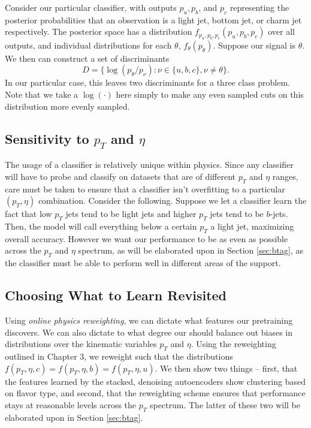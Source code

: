 Consider our particular classifier, with outputs $p_u, p_b$, and $p_c$ representing the posterior probabilities that an observation is a light jet, bottom jet, or charm jet respectively. The posterior space has a distribution $f_{p_u,p_b,p_c}(p_u, p_b, p_c)$ over all outputs, and individual distributions for each $\theta$, $f_\theta(p_\theta)$. Suppose our signal is $\theta$. We then can construct a set of discriminants
\begin{equation}
D = \{ \log(p_\theta / p_\nu) : \nu \in \{u,b,c\}, \nu \neq \theta \}.
\end{equation} 
In our particular case, this leaves two discriminants for a three class problem. Note that we take a $\log(\cdot)$ here simply to make any even sampled cuts on this distribution more evenly sampled. 

\subsection{Sensitivity to $p_T$ and $\eta$}

The usage of a classifier is relatively unique within physics. Since any classifier will have to probe and classify on datasets that are of different $p_T$ and $\eta$ ranges, care must be taken to ensure that a classifier isn't overfitting to a particular $(p_T,\eta)$ combination. Consider the following. Suppose we let a classifier learn the fact that low $p_T$ jets tend to be light jets and higher $p_T$ jets tend to be $b$-jets. Then, the model will call everything below a certain $p_T$ a light jet, maximizing overall accuracy. However we want our performance to be as even as possible across the $p_T$ and $\eta$ spectrum, as will be elaborated upon in Section \ref{sec:btag}, as the classifier must be able to perform well in different areas of the support.

\subsection{Choosing What to Learn Revisited}

Using \emph{online physics reweighting}, we can dictate what features our pretraining discovers. We can also dictate to what degree our \nn{} should balance out biases in distributions over the kinematic variables $p_T$ and $\eta$. Using the reweighting outlined in Chapter 3, we reweight such that the distributions $f(p_T, \eta, c)=f(p_T, \eta, b)=f(p_T, \eta, u)$. We then show two things -- first, that the features learned by the stacked, denoising autoencoders show clustering based on flavor type, and second, that the reweighting scheme ensures that performance stays at reasonable levels across the $p_T$ spectrum. The latter of these two will be elaborated upon in Section \ref{sec:btag}.

